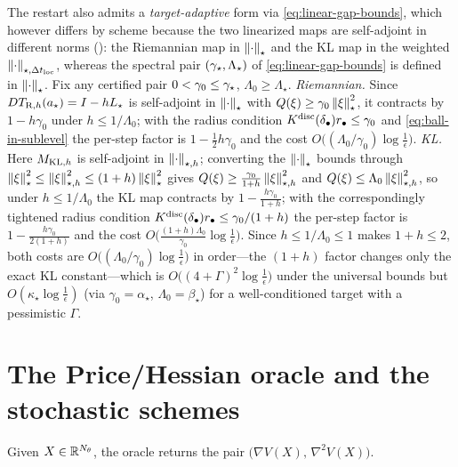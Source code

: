 \begin{remark}
The restart also admits a \emph{target-adaptive} form via \eqref{eq:linear-gap-bounds}, which
however differs by scheme because the two linearized maps are self-adjoint in different norms
(): the Riemannian map in $\left\lVert \cdot\right\rVert_\star$ and the KL map in the weighted
$\left\lVert \cdot\right\rVert_{\star,\Delta t_{\mathrm{loc}}}$, whereas the spectral pair $(\gamma_\star,\Lambda_\star)$ of
\eqref{eq:linear-gap-bounds} is defined in $\left\lVert \cdot\right\rVert_\star$. Fix any certified pair
$0<\gamma_0\leq\gamma_\star$, $\Lambda_0\geq\Lambda_\star$.
\emph{Riemannian.} Since $DT_{\mathrm{R},h}(a_\star)=I-hL_\star$ is self-adjoint in $\left\lVert \cdot\right\rVert_\star$ with
$Q(\xi)\geq\gamma_0\left\lVert \xi\right\rVert_\star^2$, it contracts by $1-h\gamma_0$ under $h\leq1/\Lambda_0$; with the
radius condition $K^{\mathrm{disc}}(\delta_\bullet)r_\bullet\leq\gamma_0$ and \eqref{eq:ball-in-sublevel} the
per-step factor is $1-\tfrac12h\gamma_0$ and the cost $O\bigl((\Lambda_0/\gamma_0)\log\tfrac1\epsilon\bigr)$.
\emph{KL.} Here $M_{\mathrm{KL},h}$ is self-adjoint in $\left\lVert \cdot\right\rVert_{\star,h}$; converting the $\left\lVert \cdot\right\rVert_\star$
bounds through $\left\lVert \xi\right\rVert_\star^2\leq\left\lVert \xi\right\rVert_{\star,h}^2\leq(1+h)\left\lVert \xi\right\rVert_\star^2$ gives
$Q(\xi)\geq\tfrac{\gamma_0}{1+h}\left\lVert \xi\right\rVert_{\star,h}^2$ and $Q(\xi)\leq\Lambda_0\left\lVert \xi\right\rVert_{\star,h}^2$, so
under $h\leq1/\Lambda_0$ the KL map contracts by $1-\tfrac{h\gamma_0}{1+h}$; with the correspondingly
tightened radius condition $K^{\mathrm{disc}}(\delta_\bullet)r_\bullet\leq\gamma_0/(1+h)$ the per-step factor is
$1-\tfrac{h\gamma_0}{2(1+h)}$ and the cost $O\bigl(\tfrac{(1+h)\Lambda_0}{\gamma_0}\log\tfrac1\epsilon\bigr)$.
Since $h\leq1/\Lambda_0\leq1$ makes $1+h\leq2$, both costs are $O\bigl((\Lambda_0/\gamma_0)\log\tfrac1\epsilon\bigr)$
in order---the $(1+h)$ factor changes only the exact KL constant---which is
$O\bigl((4+\Gamma)^2\log\tfrac1\epsilon\bigr)$ under the universal bounds but
$O(\kappa_\star\log\tfrac1\epsilon)$ (via $\gamma_0=\alpha_\star$, $\Lambda_0=\beta_\star$) for a
well-conditioned target with a pessimistic $\Gamma$.
\end{remark}

\section{The Price/Hessian oracle and the stochastic schemes}
\label{sec:stoch-schemes}

\begin{definition}
\label{def:oracle}
Given $X\in\mathbb{R}^{N_\theta}$, the oracle returns the pair $\bigl(\nabla V(X),\,\nabla^2V(X)\bigr)$.
\end{definition}

